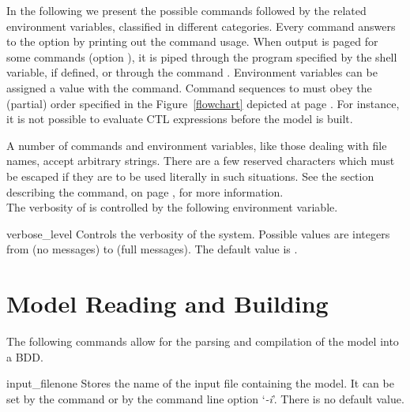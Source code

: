 \vspace{5mm}

In the following we present the possible commands followed by the
related environment variables, classified in different
categories. Every command answers to the option  by
printing out the command usage. When output is paged for some commands
(option ), it is piped through the program specified by
the \unix {} shell variable, if defined, or through the
\unix command . Environment variables can be
assigned a value with the  command.  Command
sequences to \nusmv must obey the (partial) order specified in the
Figure~\ref{flowchart} depicted at page \pageref{flowchart}. For
instance, it is not possible to evaluate CTL expressions before the
model is built.

A number of commands and environment variables, like those dealing
with file names, accept arbitrary strings. There are a few reserved
characters which must be escaped if they are to be used literally in
such situations. See the section describing the 
command, on page \pageref{History Command}, for more information.\\

The verbosity of \nusmv is controlled by the following environment
variable.

\begin{nusmvVar} {verbose\_level}{}{}
Controls the verbosity of the system. Possible values are integers from
 (no messages) to  (full messages). The
default value is .
\end{nusmvVar}

\section{Model Reading and Building}
The following commands allow for the parsing and compilation of the
model into a BDD.



\begin{nusmvVar} {input\_file}{}{none}
Stores the name of the input file containing the
model. It can be set by the  command or by the command
line option `{\it -i}'. There is no default value.
\end{nusmvVar}

